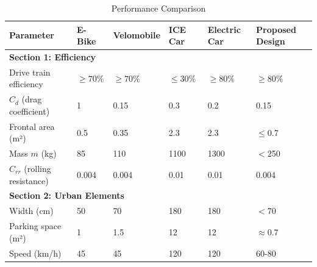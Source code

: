 \begin{table}[h!]
\caption{Performance Comparison}
\centering
\renewcommand{\arraystretch}{1.25}
\setlength{\tabcolsep}{5pt}
\begin{tabularx}{\textwidth}{lXXXXX}
\toprule
\textbf{Parameter} & \textbf{E-Bike} & \textbf{Velomobile} & \textbf{ ICE Car} & \textbf{Electric Car} & \textbf{Proposed Design} \\
\midrule
\multicolumn{6}{l}{\textbf{Section 1: Efficiency}} \\
Drive train efficiency        & \cellcolor{LightGreen}$\geq70\%$     & \cellcolor{LightGreen}$\geq70\%$     & \cellcolor{LightRed}$\leq30\%$       & \cellcolor{LightGreen}$\geq80\%$     & \cellcolor{LightGreen}$\geq80\%$ \\
$C_d$ (drag coefficient)      & \cellcolor{LightRed}1                & \cellcolor{LightGreen}0.15           & \cellcolor{LightRed}0.3              & \cellcolor{LightOrange}0.2           & \cellcolor{LightGreen}0.15 \\
Frontal area (m²)            & \cellcolor{LightGreen}0.5            & \cellcolor{LightGreen}0.35           & \cellcolor{LightRed}2.3              & \cellcolor{LightRed}2.3              & \cellcolor{LightGreen}$\leq$0.7 \\
Mass $m$ (kg)                & \cellcolor{LightGreen}85             & \cellcolor{LightGreen}110            & \cellcolor{LightRed}1100             & \cellcolor{LightRed}1300             & \cellcolor{LightGreen}$<$250 \\
$C_{rr}$ (rolling resistance) & \cellcolor{LightGreen}0.004          & \cellcolor{LightGreen}0.004          & \cellcolor{LightOrange}0.01          & \cellcolor{LightOrange}0.01          & \cellcolor{LightGreen}0.004 \\
\midrule
\multicolumn{6}{l}{\textbf{Section 2: Urban Elements}} \\
Width (cm)                  & \cellcolor{LightGreen}50             & \cellcolor{LightGreen}70             & \cellcolor{LightRed}180              & \cellcolor{LightRed}180              & \cellcolor{LightGreen}$<$70 \\
Parking space (m²)          & \cellcolor{LightGreen}1              & \cellcolor{LightGreen}1.5            & \cellcolor{LightRed}12               & \cellcolor{LightRed}12               & \cellcolor{LightGreen}$\approx$0.7 \\
Speed (km/h)                & \cellcolor{LightOrange}45            & \cellcolor{LightOrange}45            & \cellcolor{LightGreen}120            & \cellcolor{LightGreen}120            & \cellcolor{LightGreen}60-80 \\

\end{tabularx}
\end{table}

